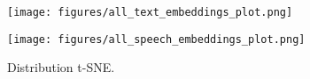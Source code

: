 
\begin{figure}[h!]
    \centering
    \begin{minipage}{0.45\textwidth}
        \centering
        \texttt{[image: figures/all\_text\_embeddings\_plot.png]}
        \label{fig:sub1}
    \end{minipage}\hfill
    \begin{minipage}{0.45\textwidth}
        \centering
        \texttt{[image: figures/all\_speech\_embeddings\_plot.png]}
        \label{fig:sub2}
    \end{minipage}
    \caption{Distribution t-SNE.}
    \label{fig:main}
\end{figure}
